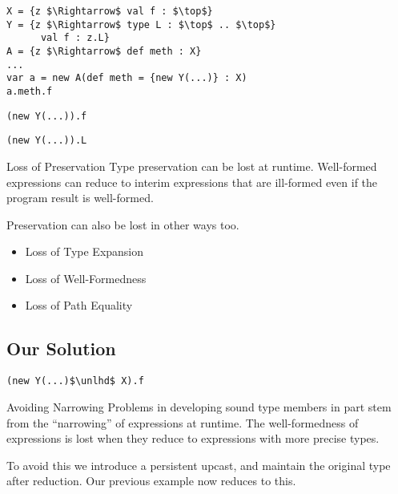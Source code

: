 \documentclass[dvipsnames]{beamer}
\begin{document}
\begin{lrbox}{\tmExPreservationA}
\begin{lstlisting}[mathescape, style=customlang]
X = {z $\Rightarrow$ val f : $\top$}
Y = {z $\Rightarrow$ type L : $\top$ .. $\top$}
	  val f : z.L}
A = {z $\Rightarrow$ def meth : X}
...
var a = new A(def meth = {new Y(...)} : X)
a.meth.f
\end{lstlisting}
\end{lrbox}

\begin{lrbox}{\tmExPreservationB}
\begin{lstlisting}[mathescape, style=customlang]
(new Y(...)).f
\end{lstlisting}
\end{lrbox}

\begin{lrbox}{\tmExPreservationC}
\begin{lstlisting}[mathescape, style=customlang]
(new Y(...)).L
\end{lstlisting}
\end{lrbox}

\begin{frame}{Loss of Preservation}
Type preservation can be lost at runtime. Well-formed expressions can reduce to interim expressions that are ill-formed even if the program result is well-formed.
\begin{block}{ }
\usebox{\tmExPreservationA}
\end{block}
Preservation can also be lost in other ways too.
\begin{itemize}
\item
Loss of Type Expansion
\item
Loss of Well-Formedness
\item
Loss of Path Equality
\end{itemize}
\end{frame}

\subsection{Our Solution}

\begin{lrbox}{\tmExPreservationD}
\begin{lstlisting}[mathescape, style=customlang]
(new Y(...)$\unlhd$ X).f
\end{lstlisting}
\end{lrbox}

\begin{frame}{Avoiding Narrowing}
Problems in developing sound type members in part stem from the ``narrowing'' of expressions at runtime. The well-formedness of expressions is lost when they reduce to expressions with more precise types.

To avoid this we introduce a persistent upcast, and maintain the original type after reduction. Our previous example now reduces to this.
\begin{block}{ }
\usebox{\tmExPreservationD}
\end{block}

\end{frame}
\end{document}
